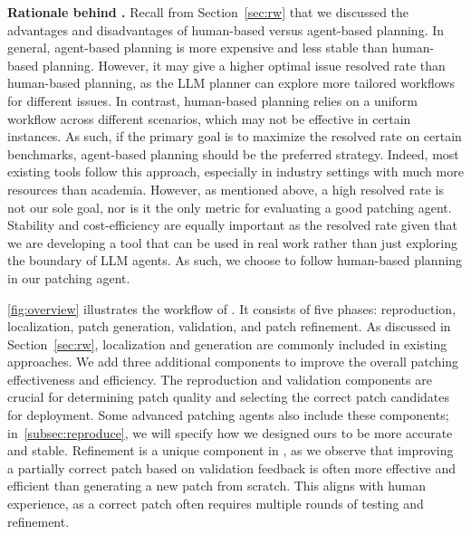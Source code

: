 \textbf{Rationale behind \sys.}
Recall from Section~\ref{sec:rw} that we discussed the advantages and disadvantages of human-based versus agent-based planning. 
In general, agent-based planning is more expensive and less stable than human-based planning.
However, it may give a higher optimal issue resolved rate than human-based planning, as the LLM planner can explore more tailored workflows for different issues.
In contrast, human-based planning relies on a uniform workflow across different scenarios, which may not be effective in certain instances.
As such, if the primary goal is to maximize the resolved rate on certain benchmarks, agent-based planning should be the preferred strategy. 
Indeed, most existing tools follow this approach, especially in industry settings with much more resources than academia.
However, as mentioned above, a high resolved rate is not our sole goal, nor is it the only metric for evaluating a good patching agent.
Stability and cost-efficiency are equally important as the resolved rate given that we are developing a tool that can be used in real work rather than just exploring the boundary of LLM agents. 
As such, we choose to follow human-based planning in our patching agent. 

\cref{fig:overview} illustrates the workflow of \sys. 
It consists of five phases: reproduction, localization, patch generation, validation, and patch refinement. 
As discussed in Section~\ref{sec:rw}, localization and generation are commonly included in existing approaches.
We add three additional components to improve the overall patching effectiveness and efficiency.
The reproduction and validation components are crucial for determining patch quality and selecting the correct patch candidates for deployment.
Some advanced patching agents also include these components; in~\cref{subsec:reproduce}, we will specify how we designed ours to be more accurate and stable.
Refinement is a unique component in \sys, as we observe that improving a partially correct patch based on validation feedback is often more effective and efficient than generating a new patch from scratch.
This aligns with human experience, as a correct patch often requires multiple rounds of testing and refinement.

